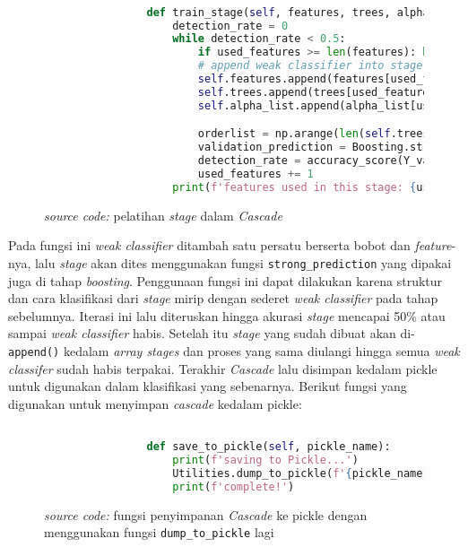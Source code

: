 		\begin{figure}[H]
			\begin{lstlisting}[language=Python, basicstyle=\tiny]

				def train_stage(self, features, trees, alpha_list, X_valid, Y_valid, used_features):
					detection_rate = 0
					while detection_rate < 0.5:
						if used_features >= len(features): break
						# append weak classifier into stage one by one
						self.features.append(features[used_features])
						self.trees.append(trees[used_features])
						self.alpha_list.append(alpha_list[used_features])

						orderlist = np.arange(len(self.trees))
						validation_prediction = Boosting.strong_prediction(self.trees, orderlist, X_valid, self.alpha_list)
						detection_rate = accuracy_score(Y_valid, validation_prediction)
						used_features += 1
					print(f'features used in this stage: {used_features}')

			\end{lstlisting}
			\caption{\emph{source code: } pelatihan \emph{stage} dalam \emph{Cascade}}
			\label{code: train stage function}
		\end{figure}

		Pada fungsi ini \emph{weak classifier} ditambah satu persatu berserta bobot dan 
		\emph{feature}-nya, lalu \emph{stage} akan dites menggunakan fungsi \texttt{strong\_prediction} 
		yang dipakai juga di tahap \emph{boosting}. Penggunaan fungsi ini dapat dilakukan 
		karena struktur dan cara klasifikasi dari \emph{stage} mirip dengan sederet \emph{weak classifier} 
		pada tahap sebelumnya. Iterasi ini lalu diteruskan hingga akurasi \emph{stage} mencapai 50\% 
		atau sampai \emph{weak classifier} habis. Setelah itu \emph{stage} yang sudah dibuat 
		akan di-\texttt{append()} kedalam \textit{array stages} dan proses yang sama diulangi hingga 
		semua \emph{weak classifer} sudah habis terpakai. Terakhir \emph{Cascade} lalu disimpan 
		kedalam pickle untuk digunakan dalam klasifikasi yang sebenarnya. Berikut fungsi yang 
		digunakan untuk menyimpan \emph{cascade} kedalam pickle:

		\begin{figure}[H]
			\begin{lstlisting}[language=Python, basicstyle=\tiny]

				def save_to_pickle(self, pickle_name):
					print(f'saving to Pickle...')
					Utilities.dump_to_pickle(f'{pickle_name}', self)
					print(f'complete!')

			\end{lstlisting}
			\caption{\emph{source code: } fungsi penyimpanan \emph{Cascade} ke pickle 
			dengan menggunakan fungsi \texttt{dump\_to\_pickle} lagi}
			\label{code: save Cascade to pickle}
		\end{figure}

